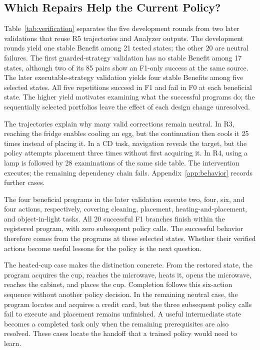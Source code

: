 \subsection{Which Repairs Help the Current Policy?}
\label{sec:verification-results}

Table~\ref{tab:verification} separates the five development rounds from two
later validations that reuse R5 trajectories and Analyzer outputs. The
development rounds yield one stable Benefit among 21 tested states;
the other 20 are neutral failures. The first guarded-strategy validation
has no stable Benefit among 17 states, although two of its 85 pairs show
an F1-only success at the same source. The later executable-strategy
validation yields four stable Benefits among five selected states.
All five repetitions succeed in F1 and fail in F0 at each beneficial
state. The higher yield motivates examining what the successful programs do;
the sequentially selected portfolios leave the effect of each design change unresolved.

The trajectories explain why many valid corrections remain neutral.
In R3, reaching the fridge enables cooling an egg, but the continuation
then cools it 25 times instead of placing it. In a CD task, navigation
reveals the target, but the policy attempts placement three times without
first acquiring it. In R4, using a lamp is followed by 28 examinations of
the same side table. The intervention executes; the remaining dependency
chain fails. Appendix~\ref{app:behavior} records further cases.

The four beneficial programs in the later validation execute two, four,
six, and four actions, respectively, covering cleaning, placement,
heating-and-placement, and object-in-light tasks. All 20 successful F1
branches finish within the registered program, with zero subsequent
policy calls. The successful behavior therefore comes from the programs at these
selected states. Whether their verified actions become useful lessons
for the policy is the next question.

The heated-cup case makes the distinction concrete. From the restored
state, the program acquires the cup, reaches the microwave, heats it,
opens the microwave, reaches the cabinet, and places the cup. Completion
follows this six-action sequence without another policy decision. In
the remaining neutral case, the program locates and acquires a credit
card, but the three subsequent policy calls fail to execute and placement
remains unfinished. A useful intermediate state becomes a completed task
only when the remaining prerequisites are also resolved. These cases
locate the handoff that a trained policy would need to learn.

